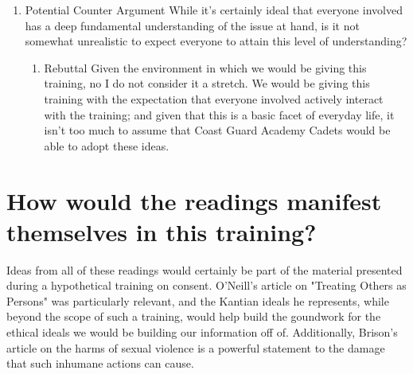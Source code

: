 \documentclass[11pt]{article}
\begin{document}
\begin{enumerate}
\item Potential Counter Argument
\label{sec:org492cb9a}
While it's certainly ideal that everyone involved has a deep fundamental understanding of the issue at hand, is it not somewhat unrealistic to expect everyone to attain this level of understanding?

\begin{enumerate}
\item Rebuttal
\label{sec:orge16bef2}
Given the environment in which we would be giving this training, no I do not consider it a stretch. We would be giving this training with the expectation that everyone involved actively interact with the training; and given that this is a basic facet of everyday life, it isn't too much to assume that Coast Guard Academy Cadets would be able to adopt these ideas.
\end{enumerate}
\end{enumerate}

\section{How would the readings manifest themselves in this training?}
\label{sec:org9f349f1}
Ideas from all of these readings would certainly be part of the material presented during a hypothetical training on consent. O'Neill's article on "Treating Others as Persons" was particularly relevant, and the Kantian ideals he represents, while beyond the scope of such a training, would help build the goundwork for the ethical ideals we would be building our information off of. Additionally, Brison's article on the harms of sexual violence is a powerful statement to the damage that such inhumane actions can cause. 
\end{document}
